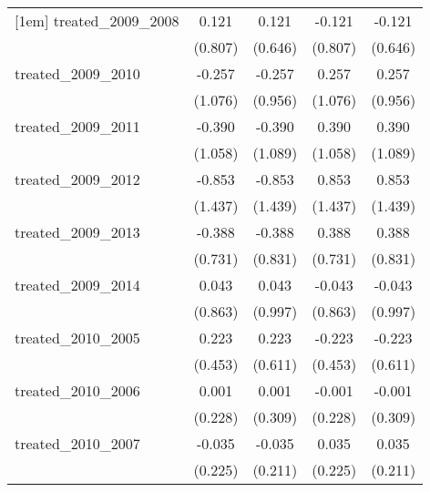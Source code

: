 {\begin{tabular}{l*{4}{c}}
[1em]
treated\_2009\_2008&       0.121         &       0.121         &      -0.121         &      -0.121         \\
            &     (0.807)         &     (0.646)         &     (0.807)         &     (0.646)         \\
[1em]
treated\_2009\_2010&      -0.257         &      -0.257         &       0.257         &       0.257         \\
            &     (1.076)         &     (0.956)         &     (1.076)         &     (0.956)         \\
[1em]
treated\_2009\_2011&      -0.390         &      -0.390         &       0.390         &       0.390         \\
            &     (1.058)         &     (1.089)         &     (1.058)         &     (1.089)         \\
[1em]
treated\_2009\_2012&      -0.853         &      -0.853         &       0.853         &       0.853         \\
            &     (1.437)         &     (1.439)         &     (1.437)         &     (1.439)         \\
[1em]
treated\_2009\_2013&      -0.388         &      -0.388         &       0.388         &       0.388         \\
            &     (0.731)         &     (0.831)         &     (0.731)         &     (0.831)         \\
[1em]
treated\_2009\_2014&       0.043         &       0.043         &      -0.043         &      -0.043         \\
            &     (0.863)         &     (0.997)         &     (0.863)         &     (0.997)         \\
[1em]
treated\_2010\_2005&       0.223         &       0.223         &      -0.223         &      -0.223         \\
            &     (0.453)         &     (0.611)         &     (0.453)         &     (0.611)         \\
[1em]
treated\_2010\_2006&       0.001         &       0.001         &      -0.001         &      -0.001         \\
            &     (0.228)         &     (0.309)         &     (0.228)         &     (0.309)         \\
[1em]
treated\_2010\_2007&      -0.035         &      -0.035         &       0.035         &       0.035         \\
            &     (0.225)         &     (0.211)         &     (0.225)         &     (0.211)         \\

\end{tabular}}
